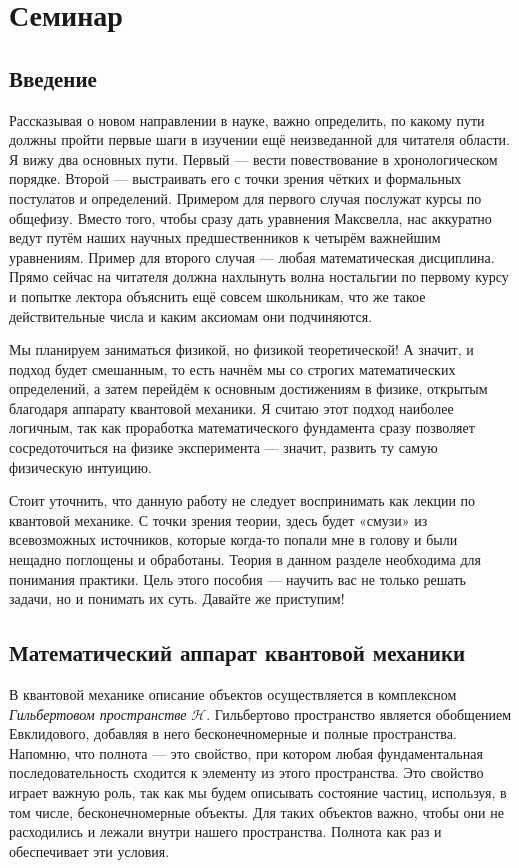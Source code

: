 \section{Семинар \thesection}

\subsection{Введение}
Рассказывая о новом направлении в науке, важно определить, по какому пути
должны пройти первые шаги в изучении ещё неизведанной для читателя области. Я
вижу два основных пути. Первый --- вести повествование в хронологическом
порядке. Второй --- выстраивать его с точки зрения чётких и формальных
постулатов и определений. Примером для первого случая послужат курсы по
общефизу. Вместо того, чтобы сразу дать уравнения Максвелла, нас аккуратно
ведут путём наших научных предшественников к четырём важнейшим уравнениям.
Пример для второго случая --- любая математическая дисциплина. Прямо сейчас на
читателя должна нахлынуть волна ностальгии по первому курсу и попытке лектора
объяснить ещё совсем школьникам, что же такое действительные числа и каким
аксиомам они подчиняются.

Мы планируем заниматься физикой, но физикой теоретической! А значит, и подход
будет смешанным, то есть начнём мы со строгих математических определений, а
затем перейдём к основным достижениям в физике, открытым благодаря аппарату
квантовой механики. Я считаю этот подход наиболее логичным, так как проработка
математического фундамента сразу позволяет сосредоточиться на физике
эксперимента --- значит, развить ту самую физическую интуицию.

Стоит уточнить, что данную работу не следует воспринимать как лекции по
квантовой механике. С точки зрения теории, здесь будет «смузи» из всевозможных
источников, которые когда-то попали мне в голову и были нещадно поглощены и
обработаны. Теория в данном разделе необходима для понимания практики. Цель
этого пособия --- научить вас не только решать задачи, но и понимать их суть.
Давайте же приступим!

\subsection{Математический аппарат квантовой механики}
В квантовой механике описание объектов осуществляется в комплексном
\textit{Гильбертовом пространстве} $\mathcal{H}$. Гильбертово пространство
является обобщением Евклидового, добавляя в него бесконечномерные и полные
пространства. Напомню, что полнота --- это свойство, при котором любая
фундаментальная последовательность сходится к элементу из этого пространства.
Это свойство играет важную роль, так как мы будем описывать состояние частиц,
используя, в том числе, бесконечномерные объекты. Для таких объектов важно,
чтобы они не расходились и лежали внутри нашего пространства. Полнота как раз и
обеспечивает эти условия.

